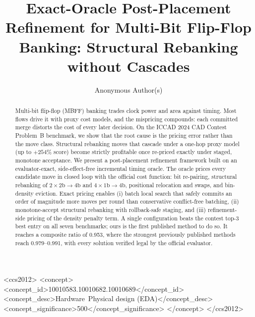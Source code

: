 \documentclass[sigconf,anonymous,review]{acmart}
\begin{document}
\title{Exact-Oracle Post-Placement Refinement for Multi-Bit Flip-Flop Banking: Structural Rebanking without Cascades}

\author{Anonymous Author(s)}

\begin{abstract}
Multi-bit flip-flop (MBFF) banking trades clock power and area against timing. Most flows drive it with proxy cost models, and the mispricing compounds: each committed merge distorts the cost of every later decision. On the ICCAD 2024 CAD Contest Problem~B benchmark, we show that the root cause is the pricing error rather than the move class. Structural rebanking moves that cascade under a one-hop proxy model (up to $+254\%$ score) become strictly profitable once re-priced exactly under staged, monotone acceptance. We present a post-placement refinement framework built on an evaluator-exact, side-effect-free incremental timing oracle. The oracle prices every candidate move in closed loop with the official cost function: bit re-pairing, structural rebanking of $2{\times}2\mathrm{b}{\to}4\mathrm{b}$ and $4{\times}1\mathrm{b}{\to}4\mathrm{b}$, positional relocation and swaps, and bin-density eviction. Exact pricing enables (i) batch local search that safely commits an order of magnitude more moves per round than conservative conflict-free batching, (ii) monotone-accept structural rebanking with rollback-safe staging, and (iii) refinement-side pricing of the density penalty term. A single configuration beats the contest top-3 best entry on all seven benchmarks; ours is the first published method to do so. It reaches a composite ratio of 0.953, where the strongest previously published methods reach 0.979--0.991, with every solution verified legal by the official evaluator.
\end{abstract}

\begin{CCSXML}
<ccs2012>
<concept>
<concept_id>10010583.10010682.10010689</concept_id>
<concept_desc>Hardware~Physical design (EDA)</concept_desc>
<concept_significance>500</concept_significance>
</concept>
</ccs2012>
\end{CCSXML}

\maketitle








\label{endofcontent}


\end{document}
